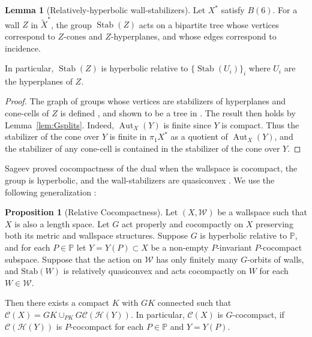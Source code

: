 \documentclass[12pt,oneside]{amsart}
\theoremstyle{definition}
\newtheorem{lem}[thm]{Lemma}
\newtheorem{prop}[thm]{Proposition}
\theoremstyle{definition}
\theoremstyle{remark}
\newcommand{\C}{\mathcal{C}}
\newcommand{\Hem}{\mathcal{H}}
\DeclareMathOperator{\Aut}{Aut}
\DeclareMathOperator{\Stab}{Stab}
\begin{document}
\begin{lem}[Relatively-hyperbolic wall-stabilizers]\label{lem: wall stabilizer relatively hyperbolic}
    Let $X^*$ satisfy  $B(6)$. For a wall $Z$ in $\widetilde X^*$, 
    the group $\Stab(Z)$ acts on a bipartite tree whose vertices correspond to $Z$-cones and $Z$-hyperplanes, and whose edges correspond to incidence. 

    In particular, $\Stab(Z)$ is hyperbolic relative to $\{\Stab(U_i)\}_i$ where $U_i$ are the hyperplanes of $Z$.
\end{lem}
\begin{proof}
The graph of groups whose vertices are stabilizers of hyperplanes and cone-cells of $Z$ is defined \cite[Def~5.16]{WiseBook}, and shown to be a tree in \cite[Thm~5.17/5.20]{WiseBook}.
The result then holds by Lemma~\ref{lem:Gsplits}. Indeed, $\Aut_X(Y)$ is finite since $Y$ is compact. Thus the stabilizer of the cone over $Y$ is finite in $\pi_1 X^*$ as a quotient of $\Aut_X(Y)$, and the stabilizer of any cone-cell is contained in the stabilizer of the cone over $Y$.
\end{proof}

Sageev proved cocompactness of the dual when the wallspace is cocompact, the group is hyperbolic, and the wall-stabilizers are quasiconvex  \cite{Sageev97}.
We use the following generalization %
\cite[Thm~7.12]{HruskaWiseAxioms}:

\begin{prop}[Relative Cocompactness]\label{prop:RelHyp relative Cocompactness} Let $(X, \mathcal{W})$ be a wallspace such that $X$ is also a length space. 
Let $G$ act properly and cocompactly on $X$ preserving both its metric and wallspace structures. Suppose $G$ is hyperbolic relative to $\mathbb{P}$, and for each $P \in \mathbb{P}$ let $Y = Y(P) \subset X$ be a non-empty $P$-invariant $P$-cocompact subspace.
%
Suppose that the action on $\mathcal{W}$ has only finitely many $G$-orbits of walls, and $\text{Stab}(W)$ is relatively quasiconvex and acts cocompactly on $W$ for each $W\in \mathcal W$.
%

%
Then there exists a compact $K$ with $GK$ connected such that $\mathcal{C}(X) = GK \cup_{PK} G\mathcal{C}(\Hem(Y))$.
In particular, $\C(X)$ is $G$-cocompact, if $\C(\Hem(Y))$ is $P$-cocompact for each $P\in \mathbb P$ and $Y=Y(P)$.
\end{prop}
\end{document}
